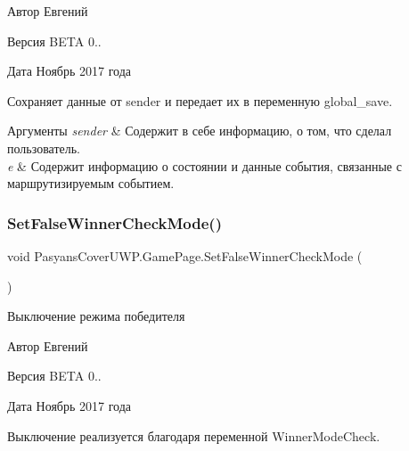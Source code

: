 \begin{DoxyAuthor}{Автор}
Евгений 
\end{DoxyAuthor}
\begin{DoxyVersion}{Версия}
B\+E\+TA 0.. 
\end{DoxyVersion}
\begin{DoxyDate}{Дата}
Ноябрь 2017 года
\end{DoxyDate}
Сохраняет данные от sender и передает их в переменную global\+\_\+save. 
\begin{DoxyParams}{Аргументы}
{\em sender} & Содержит в себе информацию, о том, что сделал пользователь. \\
\hline
{\em e} & Содержит информацию о состоянии и данные события, связанные с маршрутизируемым событием. \\
\hline
\end{DoxyParams}
\mbox{\label{class_pasyans_cover_u_w_p_1_1_game_page_a4de163f8a87e5dac6f4ef06360cdaa40}} 
\subsubsection{\texorpdfstring{Set\+False\+Winner\+Check\+Mode()}{SetFalseWinnerCheckMode()}}
{\footnotesize\ttfamily void Pasyans\+Cover\+U\+W\+P.\+Game\+Page.\+Set\+False\+Winner\+Check\+Mode (\begin{DoxyParamCaption}{ }\end{DoxyParamCaption})\hspace{0.3cm}{\ttfamily [inline]}}



Выключение режима победителя 

\begin{DoxyAuthor}{Автор}
Евгений 
\end{DoxyAuthor}
\begin{DoxyVersion}{Версия}
B\+E\+TA 0.. 
\end{DoxyVersion}
\begin{DoxyDate}{Дата}
Ноябрь 2017 года
\end{DoxyDate}
Выключение реализуется благодаря переменной Winner\+Mode\+Check. \mbox{\label{class_pasyans_cover_u_w_p_1_1_game_page_a321f58ca276bdbc44b53589d75206a75}} 
